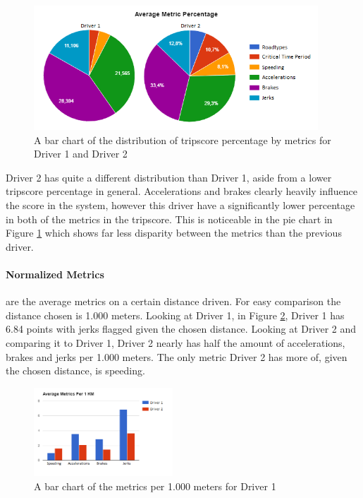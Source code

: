 \begin{figure}[tb]
\centering
\includegraphics[width=0.95\textwidth]{Pictures/piecharts}
\caption{A bar chart of the distribution of tripscore percentage by metrics for Driver 1 and Driver 2}
\label{fig:piecharts}
\end{figure}

Driver 2 has quite a different distribution than Driver 1, aside from a lower tripscore percentage in general. Accelerations and brakes clearly heavily influence the score in the system, however this driver have a significantly lower percentage in both of the metrics in the tripscore. This is noticeable in the pie chart in Figure \ref{fig:piecharts} which shows far less disparity between the metrics than the previous driver. 

\paragraph{Normalized Metrics} are the average metrics on a certain distance driven. For easy comparison the distance chosen is 1.000 meters. Looking at Driver 1, in Figure \ref{fig:avgmetricnorm}, Driver 1 has 6.84 points with jerks flagged given the chosen distance. Looking at Driver 2 and comparing it to Driver 1, Driver 2 nearly has half the amount of accelerations, brakes and jerks per 1.000 meters. The only metric Driver 2 has more of, given the chosen distance, is speeding.

\begin{figure}[tb]
\centering
\includegraphics[width=0.465\textwidth]{Pictures/AverageMetricsNorm}
\caption{A bar chart of the metrics per 1.000 meters for Driver 1}
\label{fig:avgmetricnorm}
\end{figure}

